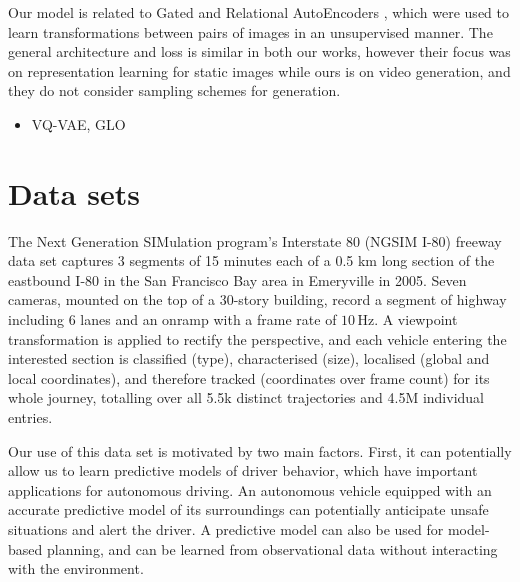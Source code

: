 \documentclass{article}
\begin{document}
Our model is related to Gated and Relational AutoEncoders \citep{RelationalAE, GAE}, which were used to learn transformations between pairs of images in an unsupervised manner.
The general architecture and loss is similar in both our works, however their focus was on representation learning for static images while ours is on video generation, and they do not consider sampling schemes for generation.

\begin{itemize}
\item VQ-VAE, GLO
\end{itemize}


\section{Data sets}

The Next Generation SIMulation program's Interstate 80 (NGSIM I-80) freeway data set \cite{halkias2006ngsim} captures 3 segments of 15 minutes each of a 0.5 km long section of the eastbound I-80 in the San Francisco Bay area in Emeryville in 2005.
Seven cameras, mounted on the top of a 30-story building, record a segment of highway including 6 lanes and an onramp with a frame rate of $10\,\text{Hz}$.
A viewpoint transformation is applied to rectify the perspective, and each vehicle entering the interested section is classified (type), characterised (size), localised (global and local coordinates), and therefore tracked (coordinates over frame count) for its whole journey, totalling over all 5.5k distinct trajectories and 4.5M individual entries.

Our use of this data set is motivated by two main factors.
First, it can potentially allow us to learn predictive models of driver behavior, which have important applications for autonomous driving.
An autonomous vehicle equipped with an accurate predictive model of its surroundings can potentially anticipate unsafe situations and alert the driver.
A predictive model can also be used for model-based planning, and can be learned from observational data without interacting with the environment.
\end{document}
